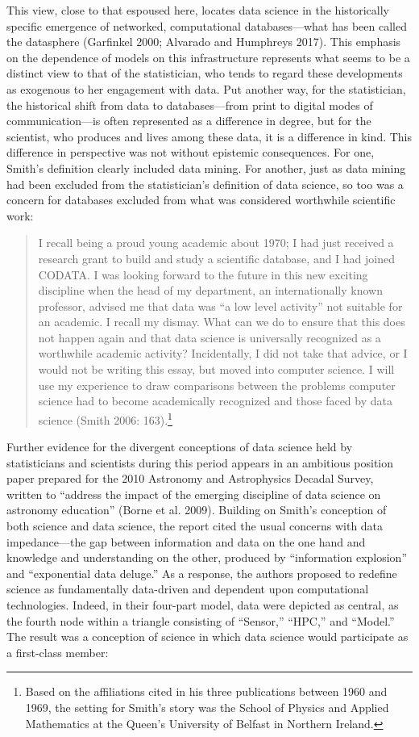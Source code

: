 \documentclass[
  letterpaper,
]{report}
\begin{document}
This view, close to that espoused here, locates data science in the
historically specific emergence of networked, computational
databases---what has been called the datasphere (Garfinkel 2000;
Alvarado and Humphreys 2017). This emphasis on the dependence of models
on this infrastructure represents what seems to be a distinct view to
that of the statistician, who tends to regard these developments as
exogenous to her engagement with data. Put another way, for the
statistician, the historical shift from data to databases---from print
to digital modes of communication---is often represented as a difference
in degree, but for the scientist, who produces and lives among these
data, it is a difference in kind. This difference in perspective was not
without epistemic consequences. For one, Smith's definition clearly
included data mining. For another, just as data mining had been excluded
from the statistician's definition of data science, so too was a concern
for databases excluded from what was considered worthwhile scientific
work:

\begin{quote}
I recall being a proud young academic about 1970; I had just received a
research grant to build and study a scientific database, and I had
joined CODATA. I was looking forward to the future in this new exciting
discipline when the head of my department, an internationally known
professor, advised me that data was ``a low level activity'' not
suitable for an academic. I recall my dismay. What can we do to ensure
that this does not happen again and that data science is universally
recognized as a worthwhile academic activity? Incidentally, I did not
take that advice, or I would not be writing this essay, but moved into
computer science. I will use my experience to draw comparisons between
the problems computer science had to become academically recognized and
those faced by data science (Smith 2006: 163).\footnote{Based on the
  affiliations cited in his three publications between 1960 and 1969,
  the setting for Smith's story was the School of Physics and Applied
  Mathematics at the Queen's University of Belfast in Northern Ireland.}
\end{quote}

Further evidence for the divergent conceptions of data science held by
statisticians and scientists during this period appears in an ambitious
position paper prepared for the 2010 Astronomy and Astrophysics Decadal
Survey, written to ``address the impact of the emerging discipline of
data science on astronomy education'' (Borne et al. 2009). Building on
Smith's conception of both science and data science, the report cited
the usual concerns with data impedance---the gap between information and
data on the one hand and knowledge and understanding on the other,
produced by ``information explosion'' and ``exponential data deluge.''
As a response, the authors proposed to redefine science as fundamentally
data-driven and dependent upon computational technologies. Indeed, in
their four-part model, data were depicted as central, as the fourth node
within a triangle consisting of ``Sensor,'' ``HPC,'' and ``Model.'' The
result was a conception of science in which data science would
participate as a first-class member:
\end{document}
